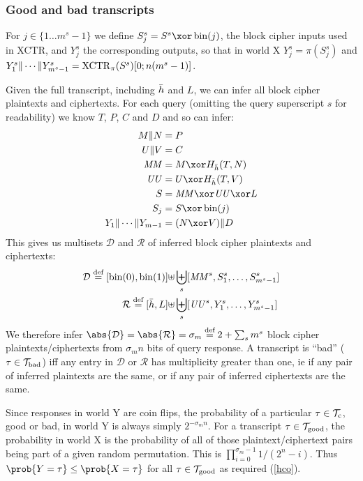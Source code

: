 \documentclass[hctr2.tex]{subfiles}
\begin{document}
\subsubsection{Good and bad transcripts}
For \(j \in \{1 \ldots m^s-1\}\) we define \(S_j^s = S^s \xor \fromint(j)\),
the block cipher inputs used in XCTR, and \(Y_j^s\) the corresponding
outputs, so that in world X \(Y_j^s = \pi(S_j^s)\) and 
\(Y_1^s \Vert \cdots \Vert Y_{m^s-1}^s = \operatorname{XCTR}_\pi(S^s)[0;n(m^s -1)]\).

Given the full transcript, including \(\bar{h}\) and \(L\),
we can infer all block cipher plaintexts and ciphertexts.
For each query
(omitting the query superscript \(s\) for readability)
we know \(T\), \(P\), \(C\) and \(D\) and so can infer:
\begin{align*}
    M \Concat N &= P \\
    U \Concat V &= C \\
    \MM &= M \xor H_{\hgen}(T, N)\\
    \UU &= U \xor H_{\hgen}(T, V)\\
    S &= \MM \xor \UU \xor L\\ 
    S_j &= S \xor \fromint(j)\\
    Y_1 \Concat \cdots \Concat Y_{m-1} &= (N \xor V) \Concat D
\end{align*}
This gives us multisets \(\mathcal{D}\) and \(\mathcal{R}\)
of inferred block cipher plaintexts and ciphertexts:
\begin{align*}
    \mathcal{D} \stackrel{\text{def}}{=} [\operatorname{bin}(0), \operatorname{bin}(1)] \uplus &
    \biguplus_s [\mathit{MM}^s, S_1^s, \ldots, S_{m^s-1}^s]\\
    \mathcal{R} \stackrel{\text{def}}{=} [\bar{h}, L] \uplus &
    \biguplus_s [\mathit{UU}^s, Y_1^s, \ldots, Y_{m^s-1}^s]
\end{align*}
We therefore infer
\(\abs{\mathcal{D}} = \abs{\mathcal{R}} = \sigma_m \defeq 2 + \sum_s m^s\)
block cipher plaintexts/ciphertexts
from \(\sigma_m n\) bits of query response.
A transcript is ``bad'' (\(\tau \in \mathcal{T}_\mathrm{bad}\))
iff any entry in \(\mathcal{D}\) or \(\mathcal{R}\)
has multiplicity greater than one,
ie if any pair of inferred plaintexts are the same, or
if any pair of inferred ciphertexts are the same.

Since responses in world Y are coin flips,
the probability of a 
particular \(\tau \in \mathcal{T}_\mathrm{c}\), good or bad,
in world Y is always simply \(2^{-\sigma_m n}\).
For a transcript \(\tau \in \mathcal{T}_\mathrm{good}\),
the probability in world X
is the probability of all of those plaintext/ciphertext
pairs being part of a given random permutation.
This is 
\(\prod_{i=0}^{\sigma_m -1}1/(2^n - i)\).
Thus \(\prob{Y = \tau} \leq \prob{X = \tau}\)
for all \(\tau \in \mathcal{T}_\mathrm{good}\) as required (\autoref{hco}).
\end{document}
